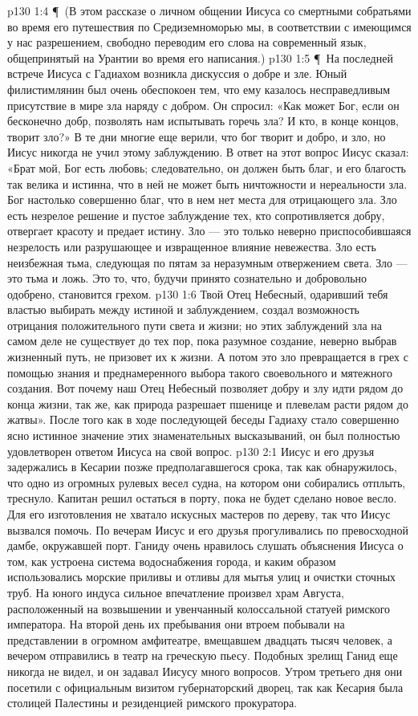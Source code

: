 \vs p130 1:4 \P\ (В этом рассказе о личном общении Иисуса со смертными собратьями во время его путешествия по Средиземноморью мы, в соответствии с имеющимся у нас разрешением, свободно переводим его слова на современный язык, общепринятый на Урантии во время его написания.)
\vs p130 1:5 \P\ На последней встрече Иисуса с Гадиахом возникла дискуссия о добре и зле. Юный филистимлянин был очень обеспокоен тем, что ему казалось несправедливым присутствие в мире зла наряду с добром. Он спросил: «Как может Бог, если он бесконечно добр, позволять нам испытывать горечь зла? И кто, в конце концов, творит зло?» В те дни многие еще верили, что бог творит и добро, и зло, но Иисус никогда не учил этому заблуждению. В ответ на этот вопрос Иисус сказал: «Брат мой, Бог есть любовь; следовательно, он должен быть благ, и его благость так велика и истинна, что в ней не может быть ничтожности и нереальности зла. Бог настолько совершенно благ, что в нем нет места для отрицающего зла. Зло есть незрелое решение и пустое заблуждение тех, кто сопротивляется добру, отвергает красоту и предает истину. Зло --- это только неверно приспособившаяся незрелость или разрушающее и извращенное влияние невежества. Зло есть неизбежная тьма, следующая по пятам за неразумным отвержением света. Зло --- это тьма и ложь. Это то, что, будучи принято сознательно и добровольно одобрено, становится грехом.
\vs p130 1:6 Твой Отец Небесный, одаривший тебя властью выбирать между истиной и заблуждением, создал возможность отрицания положительного пути света и жизни; но этих заблуждений зла на самом деле не существует до тех пор, пока разумное создание, неверно выбрав жизненный путь, не призовет их к жизни. А потом это зло превращается в грех с помощью знания и преднамеренного выбора такого своевольного и мятежного создания. Вот почему наш Отец Небесный позволяет добру и злу идти рядом до конца жизни, так же, как природа разрешает пшенице и плевелам расти рядом до жатвы». После того как в ходе последующей беседы Гадиаху стало совершенно ясно истинное значение этих знаменательных высказываний, он был полностью удовлетворен ответом Иисуса на свой вопрос.
\vs p130 2:1 Иисус и его друзья задержались в Кесарии позже предполагавшегося срока, так как обнаружилось, что одно из огромных рулевых весел судна, на котором они собирались отплыть, треснуло. Капитан решил остаться в порту, пока не будет сделано новое весло. Для его изготовления не хватало искусных мастеров по дереву, так что Иисус вызвался помочь. По вечерам Иисус и его друзья прогуливались по превосходной дамбе, окружавшей порт. Ганиду очень нравилось слушать объяснения Иисуса о том, как устроена система водоснабжения города, и каким образом использовались морские приливы и отливы для мытья улиц и очистки сточных труб. На юного индуса сильное впечатление произвел храм Августа, расположенный на возвышении и увенчанный колоссальной статуей римского императора. На второй день их пребывания они втроем побывали на представлении в огромном амфитеатре, вмещавшем двадцать тысяч человек, а вечером отправились в театр на греческую пьесу. Подобных зрелищ Ганид еще никогда не видел, и он задавал Иисусу много вопросов. Утром третьего дня они посетили с официальным визитом губернаторский дворец, так как Кесария была столицей Палестины и резиденцией римского прокуратора.
